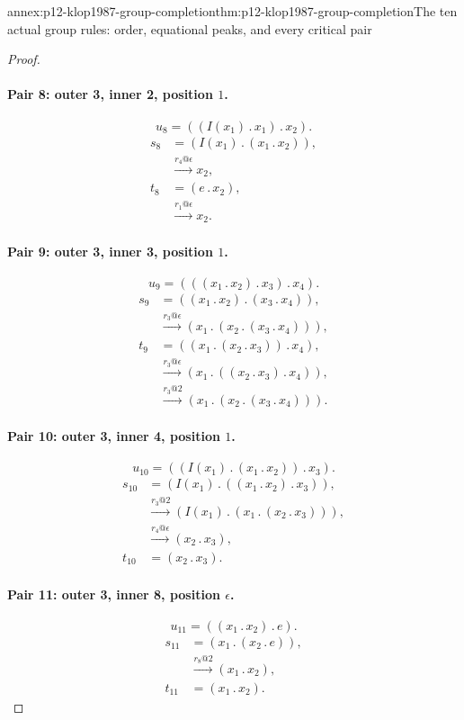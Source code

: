 \begin{annexitem}{annex:p12-klop1987-group-completion}{thm:p12-klop1987-group-completion}{The ten actual group rules: order, equational peaks, and every critical pair}
\begin{proof}
\paragraph{Pair 8: outer 3, inner 2, position \(1\).}
\[
 u_{8}=((I(x_{1})\mathbin{.}x_{1})\mathbin{.}x_{2}).
\]
\begin{align*}
 s_{8}&=(I(x_{1})\mathbin{.}(x_{1}\mathbin{.}x_{2})),\\
 &\xrightarrow{r_{4}@\epsilon}x_{2},\\
 t_{8}&=(e\mathbin{.}x_{2}),\\
 &\xrightarrow{r_{1}@\epsilon}x_{2}.
\end{align*}

\paragraph{Pair 9: outer 3, inner 3, position \(1\).}
\[
 u_{9}=(((x_{1}\mathbin{.}x_{2})\mathbin{.}x_{3})\mathbin{.}x_{4}).
\]
\begin{align*}
 s_{9}&=((x_{1}\mathbin{.}x_{2})\mathbin{.}(x_{3}\mathbin{.}x_{4})),\\
 &\xrightarrow{r_{3}@\epsilon}(x_{1}\mathbin{.}(x_{2}\mathbin{.}(x_{3}\mathbin{.}x_{4}))),\\
 t_{9}&=((x_{1}\mathbin{.}(x_{2}\mathbin{.}x_{3}))\mathbin{.}x_{4}),\\
 &\xrightarrow{r_{3}@\epsilon}(x_{1}\mathbin{.}((x_{2}\mathbin{.}x_{3})\mathbin{.}x_{4})),\\
 &\xrightarrow{r_{3}@2}(x_{1}\mathbin{.}(x_{2}\mathbin{.}(x_{3}\mathbin{.}x_{4}))).
\end{align*}

\paragraph{Pair 10: outer 3, inner 4, position \(1\).}
\[
 u_{10}=((I(x_{1})\mathbin{.}(x_{1}\mathbin{.}x_{2}))\mathbin{.}x_{3}).
\]
\begin{align*}
 s_{10}&=(I(x_{1})\mathbin{.}((x_{1}\mathbin{.}x_{2})\mathbin{.}x_{3})),\\
 &\xrightarrow{r_{3}@2}(I(x_{1})\mathbin{.}(x_{1}\mathbin{.}(x_{2}\mathbin{.}x_{3}))),\\
 &\xrightarrow{r_{4}@\epsilon}(x_{2}\mathbin{.}x_{3}),\\
 t_{10}&=(x_{2}\mathbin{.}x_{3}).
\end{align*}

\paragraph{Pair 11: outer 3, inner 8, position \(\epsilon\).}
\[
 u_{11}=((x_{1}\mathbin{.}x_{2})\mathbin{.}e).
\]
\begin{align*}
 s_{11}&=(x_{1}\mathbin{.}(x_{2}\mathbin{.}e)),\\
 &\xrightarrow{r_{8}@2}(x_{1}\mathbin{.}x_{2}),\\
 t_{11}&=(x_{1}\mathbin{.}x_{2}).
\end{align*}


\end{proof}
\end{annexitem}
